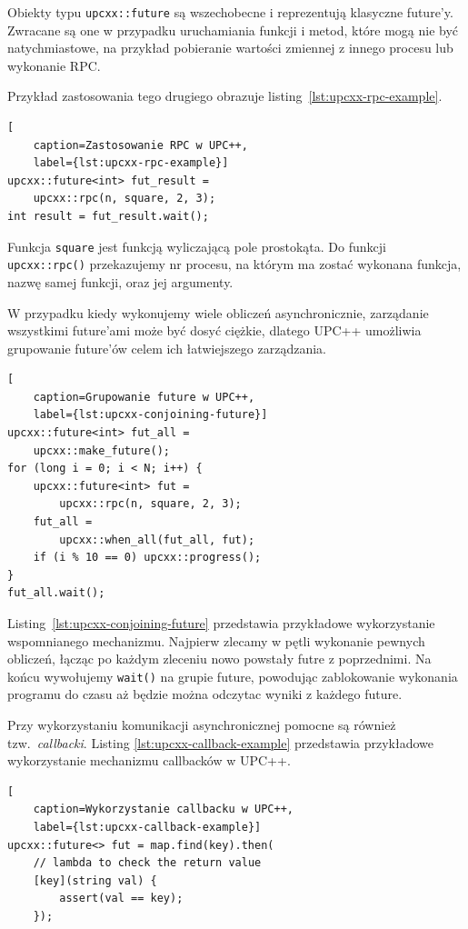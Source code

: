 \documentclass[twocolumn]{article}
\begin{document}
Obiekty typu \texttt{upcxx::future} są wszechobecne
i reprezentują klasyczne future'y.
Zwracane są one w przypadku uruchamiania funkcji
i metod, które mogą nie być natychmiastowe,
na przykład pobieranie wartości zmiennej z innego
procesu lub wykonanie RPC.

Przykład zastosowania tego drugiego obrazuje listing~\ref{lst:upcxx-rpc-example}.
\begin{lstlisting}[
    caption=Zastosowanie RPC w UPC++,
    label={lst:upcxx-rpc-example}]
upcxx::future<int> fut_result =
    upcxx::rpc(n, square, 2, 3);
int result = fut_result.wait();
\end{lstlisting}
Funkcja \texttt{square} jest funkcją wyliczającą pole prostokąta.
Do funkcji \texttt{upcxx::rpc()} przekazujemy nr procesu, na którym
ma zostać wykonana funkcja, nazwę samej funkcji, oraz jej argumenty.

W przypadku kiedy wykonujemy wiele obliczeń asynchronicznie,
zarządanie wszystkimi future'ami może być dosyć ciężkie, dlatego
UPC++ umożliwia grupowanie future'ów celem ich łatwiejszego zarządzania.
\begin{lstlisting}[
    caption=Grupowanie future w UPC++,
    label={lst:upcxx-conjoining-future}]
upcxx::future<int> fut_all =
    upcxx::make_future();
for (long i = 0; i < N; i++) {
    upcxx::future<int> fut =
        upcxx::rpc(n, square, 2, 3);
    fut_all =
        upcxx::when_all(fut_all, fut);
    if (i % 10 == 0) upcxx::progress();
}
fut_all.wait();
\end{lstlisting}
Listing~\ref{lst:upcxx-conjoining-future} przedstawia przykładowe wykorzystanie
wspomnianego mechanizmu. Najpierw zlecamy w pętli wykonanie pewnych obliczeń, łącząc
po każdym zleceniu nowo powstały futre z poprzednimi.
Na końcu wywołujemy \texttt{wait()}
na grupie future, powodując zablokowanie wykonania programu do czasu aż będzie
można odczytac wyniki z każdego future.

Przy wykorzystaniu komunikacji asynchronicznej pomocne są również tzw.\ \textit{callbacki}.
Listing \ref{lst:upcxx-callback-example} przedstawia przykładowe wykorzystanie
mechanizmu callbacków w UPC++.
\begin{lstlisting}[
    caption=Wykorzystanie callbacku w UPC++,
    label={lst:upcxx-callback-example}]
upcxx::future<> fut = map.find(key).then(
    // lambda to check the return value
    [key](string val) {
        assert(val == key);
    });
\end{lstlisting}
\end{document}
